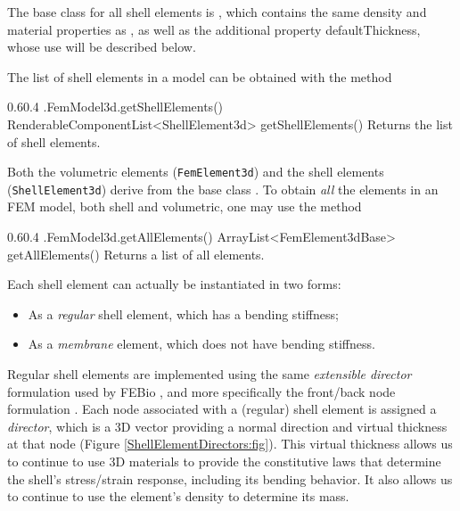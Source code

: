 The base class for all shell elements is
, which contains
the same {\sf density} and {\sf material} properties as
, as well as the
additional property {\sf defaultThickness}, whose use will be
described below.

The list of shell elements in a model can be obtained with the method
%
\begin{methodtable}{0.6}{0.4}
\midline
%
\methodentry
{\fem.FemModel3d.getShellElements()}%
{RenderableComponentList<ShellElement3d> getShellElements()}%
{Returns the list of shell elements.}%
%
\midline
\end{methodtable}
%
Both the volumetric elements ({\tt FemElement3d}) and the shell
elements ({\tt ShellElement3d}) derive from the base class
.
To obtain {\it all} the elements in an FEM model, both shell and
volumetric, one may use the method
%
\begin{methodtable}{0.6}{0.4}
\midline
%
\methodentry
{\fem.FemModel3d.getAllElements()}%
{ArrayList<FemElement3dBase> getAllElements()}%
{Returns a list of all elements.}%
%
\midline
\end{methodtable}


Each shell element can actually be instantiated in two forms:

\begin{itemize}

\item As a {\it regular} shell element, which has a bending stiffness;

\item As a {\it membrane} element, which does not have bending
stiffness.

\end{itemize}

Regular shell elements are implemented using the same {\it
extensible director} formulation used by FEBio \cite{MaasFEBio2012},
and more specifically the front/back node formulation
\cite{FEBioTheory2018}.  Each node associated with a (regular)
shell element is assigned a {\it director}, which is a 3D vector
providing a normal direction and virtual thickness at that node
(Figure \ref{ShellElementDirectors:fig}). This virtual thickness
allows us to continue to use 3D materials to provide
the constitutive laws that determine the
shell's stress/strain response, including its bending behavior. It
also allows us to continue to use the element's {\sf density} to
determine its mass.

